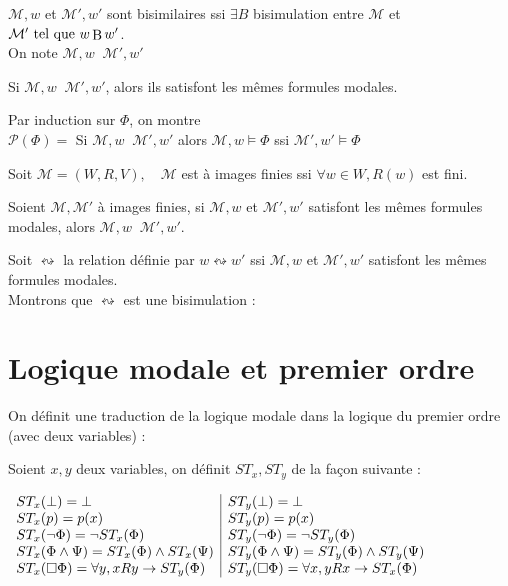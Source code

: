 \documentclass[10pt,a4paper]{article}
\newcommand{\M}{\mathcal{M}}
\DeclareMathOperator{\bisim}{\underline{\leftrightarrow}}
\DeclareMathOperator{\Bo}{B}
\begin{document}
\begin{definition}
 $ \M,w$ et  $ \M',w'$ sont bisimilaires ssi $ \exists B$ bisimulation entre $ \M$ et $ \M' \tq w   \Bo w'$.\\
On note $ \M,w \bisim \M', w'$
\end{definition}

\begin{thm}
 Si $ \M,w \bisim \M', w'$, alors ils satisfont les mêmes formules modales.
\end{thm}

\begin{dem}
 Par induction sur $ \Phi$, on montre\\
$ \mathcal{P}( \Phi)= $ \og Si $ \M,w \bisim \M', w'$ alors $ \M,w \models \Phi$ ssi $ \M',w' \models \Phi$ \fg
\end{dem}

\begin{definition}
 Soit $ \M = (W,R,V), \quad\M$ est à images finies ssi $ \forall w \in W, R(w)$ est fini.
\end{definition}

\begin{prop}
 Soient $ \M, \M'$ à images finies,
si $ \M, w$ et $ \M', w'$ satisfont les mêmes formules modales, alors  $ \M,w \bisim \M', w'$.
\end{prop}
\begin{dem}
 Soit $ \leftrightsquigarrow$ la relation définie par $w \leftrightsquigarrow w'$ ssi $ \M, w$ et $ \M', w'$ satisfont les mêmes formules modales.\\
Montrons que $ \leftrightsquigarrow$ est une bisimulation :

\end{dem}

\section{Logique modale et premier ordre}

On définit une traduction de la logique modale dans la logique du premier ordre (avec deux variables) :

Soient $x,y$ deux variables, on définit $ST_x, ST_y$ de la façon suivante :\\
\begin{center}
 
$ \begin{array}{l | l}
  ST_x( \bot) = \bot & ST_y( \bot) = \bot \\
  ST_x( p) = p(x) & ST_y( p) = p(x) \\
  ST_x( \lnot \Phi) = \lnot ST_x( \Phi) & ST_y( \lnot \Phi) = \lnot ST_y( \Phi) \\
  ST_x( \Phi \wedge \Psi) = ST_x( \Phi) \wedge ST_x(\Psi) & ST_y( \Phi \wedge \Psi) = ST_y( \Phi) \wedge ST_y(\Psi)\\
  ST_x( \Box \Phi) = \forall y, x R y \rightarrow ST_y( \Phi) & ST_y( \Box \Phi) = \forall x, y R x \rightarrow ST_x( \Phi) \\
  \end{array}
$

\end{center}
\end{document}
